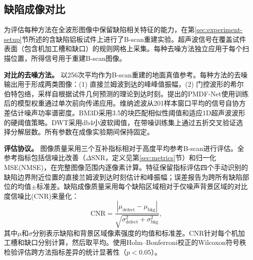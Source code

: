 \subsection{缺陷成像对比}
\label{sec:experiment-imaging}

为评估每种方法在全波形图像中保留缺陷相关特征的能力，在第\ref{sec:experiment-setup}节所述的含缺陷铝板试件上进行了B-scan重建实验。超声波信号在覆盖试件表面（包含机加工槽和缺口）的规则网格上采集。每种去噪方法独立应用于每个扫描位置，所得信号用于重建B-scan图像。

\textbf{对比的去噪方法。} 以256次平均作为B-scan重建的地面真值参考。每种方法的去噪输出用于形成两类图像：(1) 直接兰姆波到达的峰峰值振幅，(2) 门控波形的希尔伯特包络，采样自根据试件几何预测的理论到达时刻。提出的PMDF-Net使用训练后的模型权重通过单次前向传递应用。维纳滤波从201样本窗口平均的信号自协方差估计噪声功率谱密度。BM3D采用3.5的块匹配相似性阈值和适应1D超声波波形的硬阈值策略。DWT采用db4小波软阈值，在带噪训练集上通过五折交叉验证选择分解层数。所有参数在成像实验期间保持固定。

\textbf{评估协议。} 图像质量采用三个互补指标相对于高度平均参考B-scan进行评估。全参考指标包括信噪比改善（$\Delta$SNR，定义见第\ref{sec:metrics}节）和归一化MSE(NMSE)，在完整图像范围内逐像素计算。特征保留指标评估四个手动识别的缺陷边界附近位置的直接兰姆波到达时刻估计和峰振幅；误差报告为跨所有缺陷部位的均值$\pm$标准差。缺陷成像质量采用每个缺陷区域相对于仅噪声背景区域的对比度信噪比(CNR)来量化：
\begin{equation}
\text{CNR} = \frac{|\mu_{\text{defect}} - \mu_{\text{bkg}}|}{\sqrt{\sigma_{\text{defect}}^2 + \sigma_{\text{bkg}}^2}},
\end{equation}
其中$\mu$和$\sigma$分别表示缺陷和背景区域像素强度的均值和标准差。CNR针对每个机加工槽和缺口分别计算，然后取平均。使用Holm--Bonferroni校正的Wilcoxon符号秩检验评估跨方法指标差异的统计显著性（$p < 0.05$）。